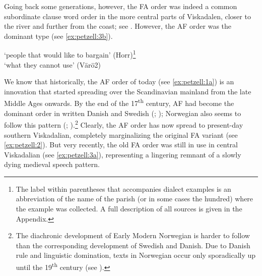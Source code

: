 \documentclass[output=paper,colorlinks,citecolor=brown,draft,draftmode]{langscibook}
\begin{document}
Going back some generations, however, the FA order was indeed a common subordinate clause word order in the more central parts of Viskadalen, closer to the river and further from the coast; see . However, the AF order was the dominant type (see \ref{ex:petzell:3b}).


\ea\label{ex:petzell:3}
\glt `people that would like to bargain’ (Horr)\footnote{The label within parentheses that accompanies dialect examples is an abbreviation of the name of the parish (or in some cases the hundred) where the example was collected. A full description of all sources is given in the Appendix.}  \\
\glt `what they cannot use’ (Värö2)
\z
\z


We know that historically, the AF order of today (see \ref{ex:petzell:1a}) is an innovation that started spreading over the Scandinavian mainland from the late Middle Ages onwards. By the end of the 17\textsuperscript{th} century, AF had become the dominant order in written Danish \citep{Sundquist2003} and Swedish (\citealt{Falk1993}; \citealt{Hakansson2011}); Norwegian also seems to follow this pattern (\citealt{Christoffersen1997}; \citealt{Vitterso2004}).\footnote{The diachronic development of Early Modern Norwegian is harder to follow than the corresponding development of Swedish and Danish. Due to Danish rule and linguistic domination, texts in Norwegian occur only sporadically up until the 19\textsuperscript{th} century (see \citealt[177–192]{Indrebo2001}).} Clearly, the AF order has now spread to present-day southern Viskadalian, completely marginalizing the original FA variant (see \ref{ex:petzell:2}). But very recently, the old FA order was still in use in central Viskadalian (see \ref{ex:petzell:3a}), representing a lingering remnant of a slowly dying medieval speech pattern.
\end{document}
